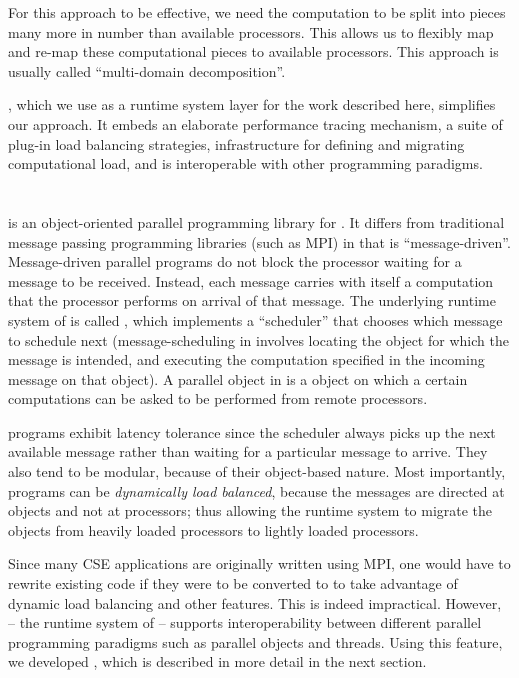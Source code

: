 \documentclass[10pt]{article}
\begin{document}
For this approach to be effective, we need the computation to be split into
pieces many more in number than available processors. This allows us to
flexibly map and re-map these computational pieces to available processors.
This approach is usually called ``multi-domain decomposition''.

\charmpp{}, which we use as a runtime system layer for the work described here,
simplifies our approach. It embeds an elaborate performance tracing mechanism,
a suite of plug-in load balancing strategies, infrastructure for defining and
migrating computational load, and is interoperable with other programming
paradigms.


\section{\charmpp{}}

\charmpp{} is an object-oriented parallel programming library for \CC{}.  It
differs from traditional message passing programming libraries (such as MPI) in
that \charmpp{} is ``message-driven''. Message-driven parallel programs do not
block the processor waiting for a message to be received.  Instead, each
message carries with itself a computation that the processor performs on
arrival of that message. The underlying runtime system of \charmpp{} is called
\converse{}, which implements a ``scheduler'' that chooses which message to
schedule next (message-scheduling in \charmpp{} involves locating the object
for which the message is intended, and executing the computation specified in
the incoming message on that object). A parallel object in \charmpp{} is a
\CC{} object on which a certain computations can be asked to be performed from
remote processors.

\charmpp{} programs exhibit latency tolerance since the scheduler always picks
up the next available message rather than waiting for a particular message to
arrive.  They also tend to be modular, because of their object-based nature.
Most importantly, \charmpp{} programs can be \emph{dynamically load balanced},
because the messages are directed at objects and not at processors; thus
allowing the runtime system to migrate the objects from heavily loaded
processors to lightly loaded processors.

Since many CSE applications are originally written using MPI, one would have to
rewrite existing code if they were to be converted to \charmpp{} to take
advantage of dynamic load balancing and other \charmpp{} features. This is
indeed impractical. However, \converse{} -- the runtime system of \charmpp{} --
supports interoperability between different parallel programming paradigms
such as parallel objects and threads. Using this feature, we developed
\ampi{}, which is described in more detail in the next section.
\end{document}
